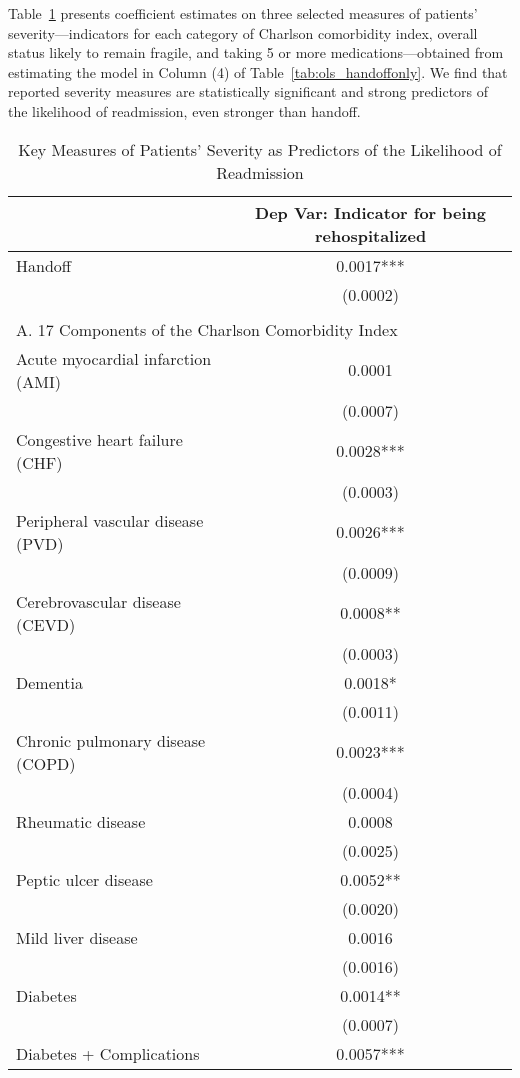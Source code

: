 \documentclass[final,12pt, notitlepage]{article}
\begin{document}
\begin{singlespace}
Table~\ref{tab:ols_corr_severity} presents coefficient estimates on three selected measures of patients' severity---indicators for each category of Charlson comorbidity index, overall status likely to remain fragile, and taking 5 or more medications---obtained from estimating the model in Column (4) of Table~\ref{tab:ols_handoffonly}.
We find that reported severity measures are statistically significant and strong predictors of the likelihood of readmission, even stronger than handoff.

\begin{table}[H]
\footnotesize
\setlength\tabcolsep{0pt}
\centering
\caption{Key Measures of Patients' Severity as Predictors of the Likelihood of Readmission}
\label{tab:ols_corr_severity}
\begin{threeparttable}
{
\begin{tabular}{lc} \toprule
 & Dep Var: Indicator for being rehospitalized \\
\midrule
Handoff & 0.0017*** \\
 & (0.0002) \\
\\
\multicolumn{2}{l}{A. 17 Components of the Charlson Comorbidity Index}\\
Acute myocardial infarction (AMI) & 0.0001 \\
 & (0.0007) \\
Congestive heart failure (CHF) & 0.0028*** \\
 & (0.0003) \\
Peripheral vascular disease (PVD) & 0.0026*** \\
 & (0.0009) \\
Cerebrovascular disease (CEVD) & 0.0008** \\
 & (0.0003) \\
Dementia & 0.0018* \\
 & (0.0011) \\
Chronic pulmonary disease (COPD) & 0.0023*** \\
 & (0.0004) \\
Rheumatic disease & 0.0008 \\
 & (0.0025) \\
Peptic ulcer disease & 0.0052** \\
 & (0.0020) \\
Mild liver disease & 0.0016 \\
 & (0.0016) \\
Diabetes & 0.0014** \\
 & (0.0007) \\
Diabetes + Complications & 0.0057*** \\

\end{tabular}}
\end{threeparttable}
\end{table}
\end{singlespace}
\end{document}
